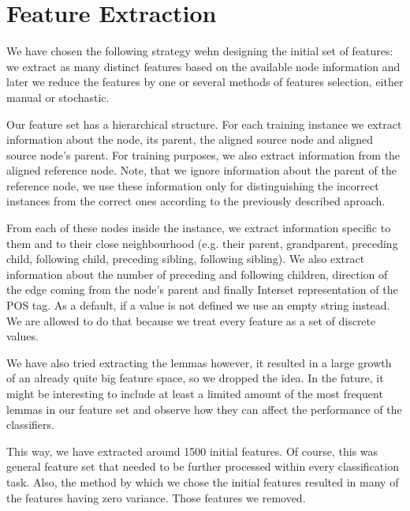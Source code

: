 \section{Feature Extraction}
\label{sec:feat_extract}


We have chosen the following strategy wehn designing the initial set of features:
we extract as many distinct features based on the available node information
and later we reduce the features by one or several methods
of features selection, either manual or stochastic.

Our feature set has a hierarchical structure. For each training instance we extract
information about the node, its parent, the aligned source node and aligned source node's
parent. For training purposes, we also extract information from the aligned reference
node. Note, that we ignore information about the parent of the reference node, we
use these information only for distinguishing the incorrect instances from the correct ones
according to the previously described aproach.

From each of these  nodes inside the instance, we extract information
specific to them and to their close neighbourhood (e.g. their parent, grandparent,
preceding child, following child, preceding sibling, following sibling). We
also extract information about the number of preceding and following children,
direction of the edge coming from the node's parent and finally Interset representation
of the POS tag. As a default, if a value is not defined we use an empty string instead.
We are allowed to do that because we treat every feature as a set of discrete values.

We have also tried extracting the lemmas however, it resulted in a
large growth of an already quite big feature space, so we dropped the idea.
In the future, it might be interesting to include at least a limited amount of the most frequent lemmas in our
feature set and observe how they can affect the performance of the classifiers.

This way, we have extracted around 1500 initial features. Of course, this was general feature
set that needed to be further processed within every classification task. Also, the method
by which we chose the initial features resulted in many of the features having zero
variance. Those features we removed.


